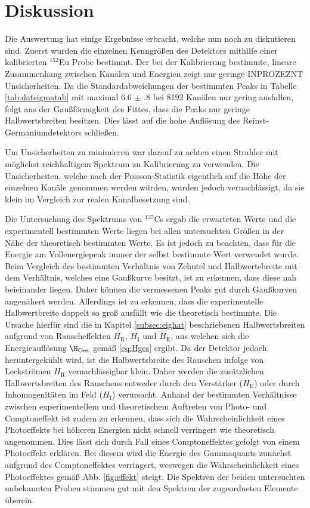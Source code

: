 
\section{Diskussion}
\label{sec:Diskussion}
Die Auswertung hat einige Ergebnisse erbracht, welche nun noch zu diskutieren sind. Zuerst wurden die einzelnen Kenngrößen des Detektors mithilfe einer kalibrierten $^{152}$Eu Probe bestimmt. Der bei der Kalibrierung bestimmte, lineare Zusammenhang zwischen Kanälen und Energien zeigt nur geringe INPROZEZNT Unsicherheiten. Da die Standardabweichungen der bestimmten Peaks in Tabelle \ref{tab:datsigmatab} mit maximal $\num{6.6(8)}$ bei 8192 Kanälen nur gering ausfallen, folgt aus der Gaußförmigkeit des Fittes, dass die Peaks nur geringe Halbwertsbreiten besitzen. Dies lässt auf die hohe Auflösung des Reinst-Germaniumdetektors schließen.

Um Unsicherheiten zu minimieren war darauf zu achten einen Strahler mit möglichst reichhaltigem Spektrum zu Kalibrierung zu verwenden. Die Unsicherheiten, welche nach der Poisson-Statistik eigentlich auf die Höhe der einzelnen Kanäle genommen werden würden, wurden jedoch vernachlässigt, da sie klein im Vergleich zur realen Kanalbesetzung sind.

Die Untersuchung des Spektrums von $^{137}$Cs ergab die erwarteten Werte und die experimentell bestimmten Werte liegen bei allen untersuchten Größen in der Nähe der theoretisch bestimmten Werte. Es ist jedoch zu beachten, dass für die Energie am Vollenergiepeak immer der selbst bestimmte Wert verwendet wurde. Beim Vergleich des bestimmten Verhältnis von Zehntel und Halbwertsbreite mit dem Verhältnis, welches eine Gaußkurve besitzt, ist zu erkennen, dass diese nah beieinander liegen. Daher können die vermessenen Peaks gut durch Gaußkurven angenähert werden. Allerdings ist zu erkennen, dass die experimentelle Halbwertbreite doppelt so groß ausfällt wie die theoretisch bestimmte. Die Ursache hierfür sind die in Kapitel \ref{subsec:eighat} beschriebenen Halbwertsbreiten aufgrund von Rauscheffekten $H_\text{R}$, $H_\text{I}$ und $H_\text{E}$, aus welchen sich die Energieauflösung $\H_\text{Ges}$ gemäß \eqref{eq:Hges} ergibt. Da der Detektor jedoch heruntergekühlt wird, ist die Halbwertsbreite des Rauschen infolge von Leckströmen $H_\text{R}$ vernachlässigbar klein. Daher werden die zusätzlichen Halbwertsbreiten des Rauschens entweder durch den Verstärker ($H_\text{E}$) oder durch Inhomogenitäten im Feld ($H_\text{I}$) verursacht. Anhand der bestimmten Verhältnisse zwischen experimentellem und theoretischem Auftreten von Photo- und Comptoneffekt ist zudem zu erkennen, dass sich die Wahrscheinlichkeit eines Photoeffekts bei höheren Energien nicht schnell verringert wie theoretisch angenommen. Dies lässt sich durch Fall eines Comptoneffektes gefolgt von einem Photoeffekt erklären. Bei diesem wird die Energie des Gammaquants zunächst aufgrund des Comptoneffektes verringert, weswegen die Wahrscheinlichkeit eines Photoeffektes gemäß Abb. \ref{fig:effekt} steigt.
Die Spektren der beiden untersuchten unbekannten Proben stimmen gut mit den Spektren der zugeordneten Elemente überein.
